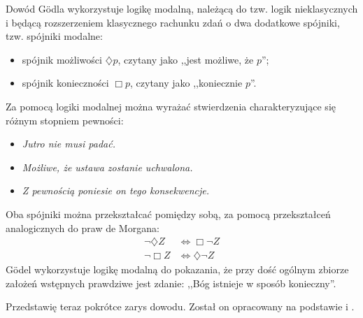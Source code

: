 \documentclass[
	runningheads
]{llncs}
\begin{document}
Dowód G\"odla wykorzystuje logikę modalną, należącą do tzw. logik nieklasycznych i będącą rozszerzeniem klasycznego rachunku zdań o dwa dodatkowe spójniki, tzw. spójniki modalne: 
\begin{itemize}
	\item spójnik możliwości $\diamondsuit p$, czytany jako ,,jest możliwe, że $p$'';
	\item spójnik konieczności $\Box p$, czytany jako ,,koniecznie $p$''.
\end{itemize} 
Za pomocą logiki modalnej można wyrażać stwierdzenia charakteryzujące się różnym stopniem pewności: 
\begin{itemize}
	\item \emph{Jutro nie musi padać.}
	\item \emph{Możliwe, że ustawa zostanie uchwalona.}
	\item \emph{Z pewnością poniesie on tego konsekwencje.}
\end{itemize}
Oba spójniki można przekształcać pomiędzy sobą, za pomocą przekształceń analogicznych do praw de Morgana:
\begin{align*}
\neg \diamondsuit Z & \Leftrightarrow \Box \neg Z \\ 
\neg \Box Z & \Leftrightarrow \diamondsuit \neg Z
\end{align*}
G\"odel wykorzystuje logikę modalną do pokazania, że przy dość ogólnym zbiorze założeń wstępnych prawdziwe jest zdanie: ,,Bóg istnieje w sposób konieczny''. 

Przedstawię teraz pokrótce zarys dowodu. Został on opracowany na podstawie \cite{goedel1995} i \cite{sobel2004}. 

\setcounter{axiom-pl}{0}
\setcounter{definition-pl}{0}
\setcounter{theorem-pl}{0}
\end{document}

